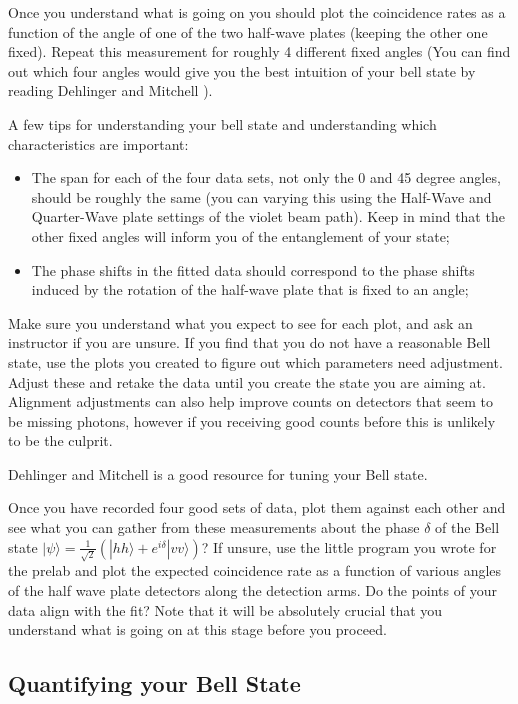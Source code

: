 \documentclass{../lab}
\begin{document}
Once you understand what is going on you should plot the coincidence rates  as a function of the angle of one of the two half-wave plates (keeping the other one fixed). Repeat this measurement for roughly 4 different fixed angles (You can find out which four angles would give you the best intuition of your bell state by reading Dehlinger and Mitchell \cite{Dehlinger}).

A few tips for understanding your bell state and understanding which characteristics are important:

\begin{itemize}
    \item The span for each of the four data sets, not only the 0 and 45 degree angles, should be roughly the same (you can varying this using the Half-Wave and Quarter-Wave plate settings of the violet beam path). Keep in mind that the other fixed angles will inform you of the entanglement of your state;

    \item The phase shifts in the fitted data should correspond to the phase shifts induced by the rotation of the half-wave plate that is fixed to an angle;
\end{itemize}

Make sure you understand what you expect to see for each plot, and ask an instructor if you are unsure. If you find that you do not have a reasonable Bell state, use the plots you created to figure out which parameters need adjustment. Adjust these and retake the data until you create the state you are aiming at. Alignment adjustments can also help improve counts on detectors that seem to be missing photons, however if you receiving good counts before this is unlikely to be the culprit.

Dehlinger and Mitchell \cite{Dehlinger} is a good resource for tuning your Bell state.

Once you have recorded four good sets of data, plot them against each other and see what you can gather from these measurements about the phase $\delta$ of the Bell state $|\psi\rangle = \frac{1}{\sqrt{2}} (|hh\rangle + e^{i\delta} |vv\rangle)$? If unsure, use the little program you wrote for the prelab and plot the expected coincidence rate as a function of various angles of the half wave plate detectors along the detection arms. Do the points of your data align with the fit? Note that it will be absolutely crucial that you understand what is going on at this stage before you proceed.

\subsection{Quantifying your Bell State}
\end{document}
